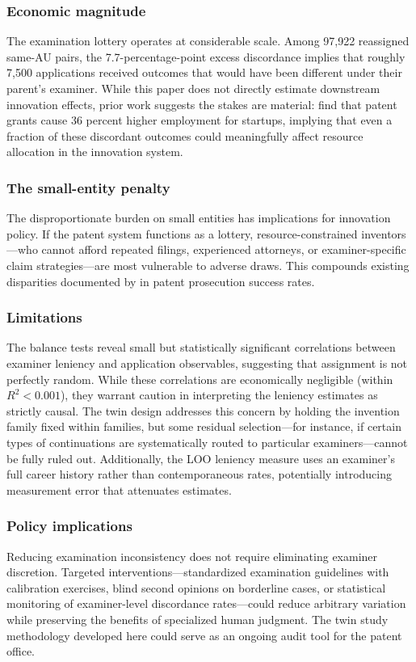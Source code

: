 \documentclass[12pt]{article}
\begin{document}
\subsubsection*{Economic magnitude} The examination lottery operates at considerable scale. Among 97,922 reassigned same-AU pairs, the 7.7-percentage-point excess discordance implies that roughly 7,500 applications received outcomes that would have been different under their parent's examiner. While this paper does not directly estimate downstream innovation effects, prior work suggests the stakes are material: \citet{farre2020patent} find that patent grants cause 36 percent higher employment for startups, implying that even a fraction of these discordant outcomes could meaningfully affect resource allocation in the innovation system.

\subsubsection*{The small-entity penalty} The disproportionate burden on small entities has implications for innovation policy. If the patent system functions as a lottery, resource-constrained inventors---who cannot afford repeated filings, experienced attorneys, or examiner-specific claim strategies---are most vulnerable to adverse draws. This compounds existing disparities documented by \citet{jensen2015gender} in patent prosecution success rates.

\subsubsection*{Limitations} The balance tests reveal small but statistically significant correlations between examiner leniency and application observables, suggesting that assignment is not perfectly random. While these correlations are economically negligible (within $R^2 < 0.001$), they warrant caution in interpreting the leniency estimates as strictly causal. The twin design addresses this concern by holding the invention family fixed within families, but some residual selection---for instance, if certain types of continuations are systematically routed to particular examiners---cannot be fully ruled out. Additionally, the LOO leniency measure uses an examiner's full career history rather than contemporaneous rates, potentially introducing measurement error that attenuates estimates.

\subsubsection*{Policy implications} Reducing examination inconsistency does not require eliminating examiner discretion. Targeted interventions---standardized examination guidelines with calibration exercises, blind second opinions on borderline cases, or statistical monitoring of examiner-level discordance rates---could reduce arbitrary variation while preserving the benefits of specialized human judgment. The twin study methodology developed here could serve as an ongoing audit tool for the patent office.
\end{document}
